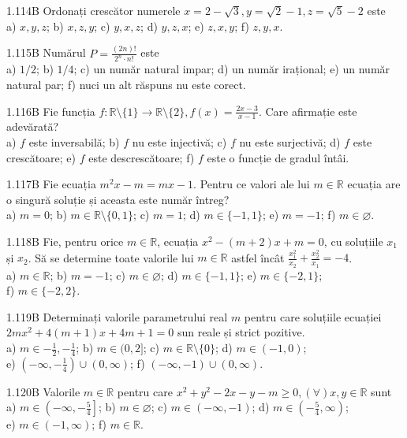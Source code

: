 \documentclass[11pt]{article}
\begin{document}
1.114B Ordonați crescător numerele $x=2-\sqrt{3}, y=\sqrt{2}-1, z=\sqrt{5}-2$ este\\ a) $x, y, z$; b) $x, z, y$; c) $y, x, z$; d) $y, z, x$; e) $z, x, y$; f) $z, y, x$.

1.115B Numărul $P=\frac{(2 n)!}{2^{n} \cdot n!}$ este\\ a) $1 / 2$; b) $1 / 4$; c) un număr natural impar; d) un număr irațional; e) un număr natural par; f) nuci un alt răspuns nu este corect.

1.116B Fie funcția $f: \mathbb{R} \setminus\{1\} \rightarrow \mathbb{R} \setminus\{2\}, f(x)=\frac{2 x-3}{x-1}$. Care afirmație este adevărată?\\ a) $f$ este inversabilă; b) $f$ nu este injectivă; c) $f$ nu este surjectivă; d) $f$ este crescătoare; e) $f$ este descrescătoare; f) $f$ este o funcție de gradul întâi.

1.117B Fie ecuația $m^{2} x-m=m x-1$. Pentru ce valori ale lui $m \in \mathbb{R}$ ecuația are o singură soluție și aceasta este număr întreg?\\ a) $m=0$; b) $m \in \mathbb{R} \setminus \{0,1\}$; c) $m=1$; d) $m \in \{-1,1\}$; e) $m=-1$; f) $m \in \varnothing$.

1.118B Fie, pentru orice $m \in \mathbb{R}$, ecuația $x^{2}-(m+2)x+m=0$, cu soluțiile $x_{1}$ și $x_{2}$. Să se determine toate valorile lui $m \in \mathbb{R}$ astfel încât $\frac{x_{1}^{2}}{x_{2}}+\frac{x_{2}^{2}}{x_{1}}=-4$.\\ a) $m \in \mathbb{R}$; b) $m=-1$; c) $m \in \varnothing$; d) $m \in \{-1,1\}$; e) $m \in \{-2,1\}$;\\ f) $m \in \{-2,2\}$.

1.119B Determinați valorile parametrului real $m$ pentru care soluțiile ecuației $2mx^{2}+4(m+1)x+4m+1=0$ sun reale și strict pozitive.\\ a) $m \in {-\frac{1}{2},-\frac{1}{4}}$; b) $m \in (0,2]$; c) $m \in \mathbb{R} \setminus\{0\}$; d) $m \in (-1,0)$;\\ e) $(-\infty,-\frac{1}{4}) \cup(0, \infty)$; f) $(-\infty,-1) \cup(0, \infty)$.

1.120B Valorile $m \in \mathbb{R}$ pentru care $x^{2}+y^{2}-2 x-y-m \geq 0,(\forall) x, y \in \mathbb{R}$ sunt\\ a) $m \in\left(-\infty,-\frac{5}{4}\right]$; b) $m \in \varnothing$; c) $m \in(-\infty,-1)$; d) $m \in\left(-\frac{5}{4}, \infty\right)$;\\ e) $m \in(-1, \infty)$; f) $m \in \mathbb{R}$.
\end{document}
